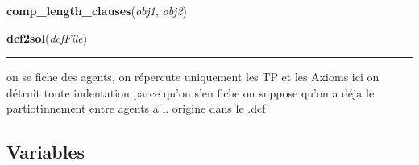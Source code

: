     \vspace{0.5ex}

\hspace{.8\funcindent}\begin{boxedminipage}{\funcwidth}

    \raggedright \textbf{comp\_length\_clauses}(\textit{obj1}, \textit{obj2})

\setlength{\parskip}{2ex}
\setlength{\parskip}{1ex}
    \end{boxedminipage}

    \label{etude:utils:futils:dcf2sol}

    \vspace{0.5ex}

\hspace{.8\funcindent}\begin{boxedminipage}{\funcwidth}

    \raggedright \textbf{dcf2sol}(\textit{dcfFile})

    \vspace{-1.5ex}

    \rule{\textwidth}{0.5\fboxrule}
\setlength{\parskip}{2ex}
    on se fiche des agents, on répercute uniquement les TP et les Axioms 
    ici on détruit toute indentation parce qu'on s'en fiche on suppose 
    qu'on a déja le partiotinnement entre agents a l. origine dans le .dcf

\setlength{\parskip}{1ex}
    \end{boxedminipage}



  \subsection{Variables}


